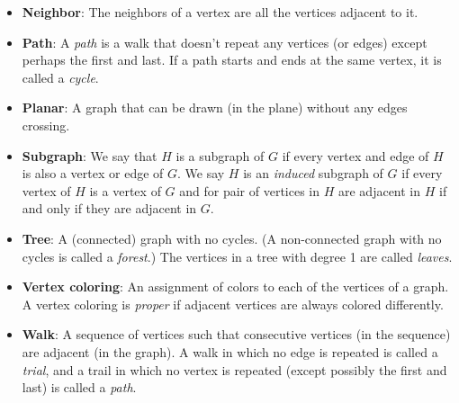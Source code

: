 \documentclass[10pt]{exam}
\begin{document}
\begin{itemize}
    \item[] \textbf{Neighbor}: The neighbors of a vertex are all the vertices adjacent to it.
    \item[] \textbf{Path}: A \emph{path} is a walk that doesn't repeat any vertices (or edges) except perhaps the first and last.  If a path starts and ends at the same vertex, it is called a \emph{cycle}.
    \item[] \textbf{Planar}: A graph that can be drawn (in the plane) without any edges crossing.
    \item[] \textbf{Subgraph}: We say that $H$ is a subgraph of $G$ if every vertex and edge of $H$ is also a vertex or edge of $G$.  We say $H$ is an {\em induced} subgraph of $G$ if every vertex of $H$ is a vertex of $G$ and for pair of vertices in $H$ are adjacent in $H$ if and only if they are adjacent in $G$.
    \item[] \textbf{Tree}: A (connected) graph with no cycles.  (A non-connected graph with no cycles is called a {\em forest}.)  The vertices in a tree with degree 1 are called {\em leaves}.
    \item[] \textbf{Vertex coloring}: An assignment of colors to each of the vertices of a graph. A vertex coloring is {\em proper} if adjacent vertices are always colored differently.
		\item[] \textbf{Walk}: A sequence of vertices such that consecutive vertices (in the sequence) are adjacent (in the graph).  A walk in which no edge is repeated is called a \emph{trial}, and a trail in which no vertex is repeated (except possibly the first and last) is called a \emph{path}.


  \end{itemize}
\end{document}
